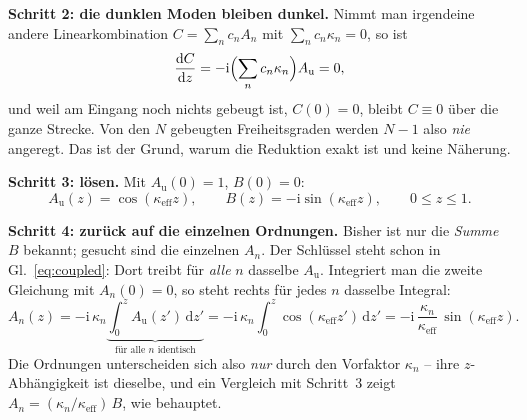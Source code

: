 \documentclass[11pt,a4paper]{article}
\begin{document}
\medskip
\noindent\textbf{Schritt 2: die dunklen Moden bleiben dunkel.} Nimmt man
irgendeine andere Linearkombination $C=\sum_n c_n A_n$ mit
$\sum_n c_n\kappa_n = 0$, so ist
\begin{equation}
  \frac{\mathrm{d}C}{\mathrm{d}z} = -\mathrm{i}\Bigl(\sum_n c_n\kappa_n\Bigr) A_\mathrm{u} = 0 ,
\end{equation}
und weil am Eingang noch nichts gebeugt ist, $C(0)=0$, bleibt $C\equiv 0$
über die ganze Strecke. Von den $N$ gebeugten Freiheitsgraden werden $N-1$
also \emph{nie} angeregt. Das ist der Grund, warum die Reduktion exakt ist
und keine Näherung.

\medskip
\noindent\textbf{Schritt 3: lösen.} Mit $A_\mathrm{u}(0)=1$, $B(0)=0$:
\begin{equation}
  A_\mathrm{u}(z) = \cos(\kappa_\mathrm{eff}z) , \qquad B(z) = -\mathrm{i}\sin(\kappa_\mathrm{eff}z) ,
  \qquad 0\le z\le 1 .
\end{equation}

\medskip
\noindent\textbf{Schritt 4: zurück auf die einzelnen Ordnungen.} Bisher ist
nur die \emph{Summe} $B$ bekannt; gesucht sind die einzelnen $A_n$. Der
Schlüssel steht schon in Gl.~\eqref{eq:coupled}: Dort treibt für \emph{alle}
$n$ dasselbe $A_\mathrm{u}$. Integriert man die zweite Gleichung mit $A_n(0)=0$, so
steht rechts für jedes $n$ dasselbe Integral:
\begin{equation}
  A_n(z) = -\mathrm{i}\,\kappa_n \underbrace{\int_0^z A_\mathrm{u}(z')\,\mathrm{d}z'}_{
           \text{für alle } n \text{ identisch}}
         = -\mathrm{i}\,\kappa_n \int_0^z \cos(\kappa_\mathrm{eff}z')\,\mathrm{d}z'
         = -\mathrm{i}\,\frac{\kappa_n}{\kappa_\mathrm{eff}}\,\sin(\kappa_\mathrm{eff}z) .
  \label{eq:anexplicit}
\end{equation}
Die Ordnungen unterscheiden sich also \emph{nur} durch den Vorfaktor
$\kappa_n$ -- ihre $z$-Abhängigkeit ist dieselbe, und ein Vergleich mit
Schritt~3 zeigt $A_n = (\kappa_n/\kappa_\mathrm{eff})\,B$, wie behauptet.
\end{document}
